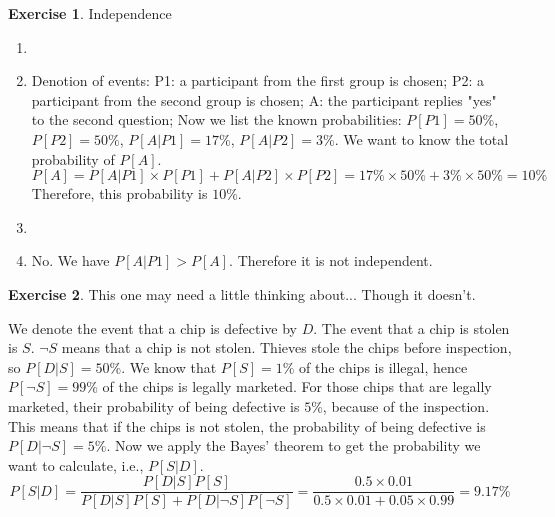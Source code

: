 \documentclass[12pt,a4paper]{article}
\makeatletter
\theoremstyle{definition}
\newtheorem{exercise}{Exercise}
\newtheorem*{solution}{Solution}
\renewenvironment{solution}[1][Solution] {\par\pushQED{\qed}\normalfont\topsep6\p@\@plus6\p@\relax\trivlist\item[\hskip\labelsep\bfseries#1\@addpunct{.}]\ignorespaces}{\popQED\endtrivlist\@endpefalse} \makeatother
\makeatother
\begin{document}
\begin{exercise}
    Independence
    \begin{enumerate}[label=\roman*)]
        \item
        \begin{solution}
            Denotion of events:
            \newline P1: a participant from the first group is chosen;
            \newline P2: a participant from the second group is chosen;
            \newline A: the participant replies "yes" to the second question;
            \newline Now we list the known probabilities: $P[P1]=50\%$, $P[P2]=50\%$, $P[A|P1]=17\%$, $P[A|P2]=3\%$. We want to know the total probability of $P[A]$.
            \begin{equation*}
                P[A]=P[A|P1]\times P[P1]+P[A|P2]\times P[P2]=17\% \times 50\% + 3\% \times 50\% = 10\%
            \end{equation*}
            Therefore, this probability is $10\%$.
        \end{solution}
        \item 
        \begin{solution}
            No. We have $P[A|P1] > P[A]$. Therefore it is not independent.
        \end{solution}
    \end{enumerate}
\end{exercise}
\begin{exercise}
    This one may need a little thinking about... Though it doesn't.
    \begin{solution}
        We denote the event that a chip is defective by $D$. The event that a chip is stolen is $S$. $\neg S$ means that a chip is not stolen. Thieves stole the chips before inspection, so $P[D|S]=50\% $. We know that $P[S]=1\%$ of the chips is illegal, hence $P[\neg S] = 99\%$ of the chips is legally marketed. For those chips that are legally marketed, their probability of being defective is $5\%$, because of the inspection. This means that if the chips is not stolen, the probability of being defective is $P[D|\neg S]=5\%$. Now we apply the Bayes' theorem to get the probability we want to calculate, i.e., $P[S|D]$.
        \begin{equation*}
            P[S|D]=\frac{P[D|S]P[S]}{P[D|S]P[S]+P[D|\neg S]P[\neg S]}=\frac{0.5\times 0.01}{0.5\times 0.01+0.05\times 0.99}=9.17\%
        \end{equation*}
    \end{solution}
\end{exercise}
\end{document}
